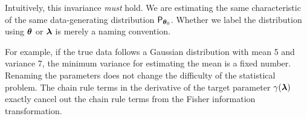 \begin{note}
    Intuitively, this invariance \textit{must} hold. We are estimating the same characteristic of the same data-generating distribution \(\mathsf{P}_{\boldsymbol{\theta}_0}\). Whether we label the distribution using \(\boldsymbol{\theta}\) or \(\boldsymbol{\lambda}\) is merely a naming convention. 
    
    For example, if the true data follows a Gaussian distribution with mean 5 and variance 7, the minimum variance for estimating the mean is a fixed number. Renaming the parameters does not change the difficulty of the statistical problem. The chain rule terms in the derivative of the target parameter \(\gamma(\boldsymbol{\lambda})\) exactly cancel out the chain rule terms from the Fisher information transformation.
\end{note}
